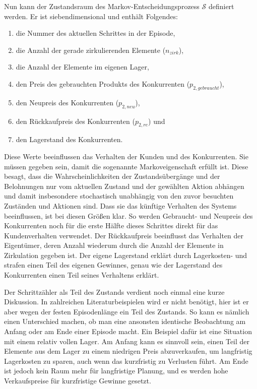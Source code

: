 Nun kann der Zustandsraum des Markov-Entscheidungsprozess $\mathcal{S}$ definiert werden.
Er ist siebendimensional und enthält Folgendes:
\begin{enumerate}
	\item die Nummer des aktuellen Schrittes in der Episode,
	\item die Anzahl der gerade zirkulierenden Elemente ($n_{zirk}$),
	\item die Anzahl der Elemente im eigenen Lager,
	\item den Preis des gebrauchten Produkts des Konkurrenten ($p_{2, gebraucht}$),
	\item den Neupreis des Konkurrenten ($p_{2, neu}$),
	\item den Rückkaufpreis des Konkurrenten ($p_{2, re}$) und
	\item den Lagerstand des Konkurrenten.
\end{enumerate}
Diese Werte beeinflussen das Verhalten der Kunden und des Konkurrenten.
Sie müssen gegeben sein, damit die sogenannte Markoveigenschaft erfüllt ist.
Diese besagt, dass die Wahrscheinlichkeiten der Zustandsübergänge und der Belohnungen nur vom aktuellen Zustand und der gewählten Aktion abhängen und damit insbesondere stochastisch unabhängig von den zuvor besuchten Zuständen und Aktionen sind.
Dass sie das künftige Verhalten des Systems beeinflussen, ist bei diesen Größen klar.
So werden Gebraucht- und Neupreis des Konkurrenten noch für die erste Hälfte dieses Schrittes direkt für das Kundenverhalten verwendet.
Der Rückkaufpreis beeinflusst das Verhalten der Eigentümer, deren Anzahl wiederum durch die Anzahl der Elemente in Zirkulation gegeben ist.
Der eigene Lagerstand erklärt durch Lagerkosten- und strafen einen Teil des eigenen Gewinnes, genau wie der Lagerstand des Konkurrenten einen Teil seines Verhaltens erklärt.

Der Schrittzähler als Teil des Zustands verdient noch einmal eine kurze Diskussion.
In zahlreichen Literaturbeispielen wird er nicht benötigt, hier ist er aber wegen der festen Episodenlänge ein Teil des Zustands.
So kann es nämlich einen Unterschied machen, ob man eine ansonsten identische Beobachtung am Anfang oder am Ende einer Episode macht.
Ein Beispiel dafür ist eine Situation mit einem relativ vollen Lager.
Am Anfang kann es sinnvoll sein, einen Teil der Elemente aus dem Lager zu einem niedrigen Preis abzuverkaufen, um langfristig Lagerkosten zu sparen, auch wenn das kurzfristig zu Verlusten führt.
Am Ende ist jedoch kein Raum mehr für langfristige Planung, und es werden hohe Verkaufspreise für kurzfristige Gewinne gesetzt.

